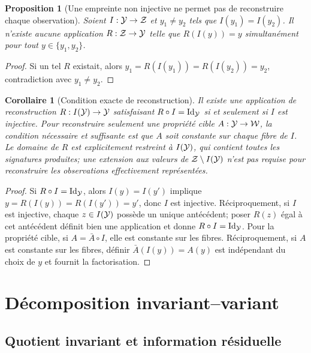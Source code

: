 \documentclass[11pt,oneside]{book}
\newtheorem{proposition}[theoreme]{Proposition}
\newtheorem{corollaire}[theoreme]{Corollaire}
\theoremstyle{definition}\newtheorem{definition}[theoreme]{Définition}\newtheorem{hypothese}[theoreme]{Hypothèse explicite}\newtheorem{convention}[theoreme]{Convention}\newtheorem{critere}[theoreme]{Critère}
\theoremstyle{remark}\newtheorem{remarque}[theoreme]{Remarque}\newtheorem{contreexemple}[theoreme]{Contre-exemple}
\begin{document}
\begin{proposition}[Une empreinte non injective ne permet pas de reconstruire chaque observation]
Soient \(I:\mathcal Y\to\mathcal Z\) et \(y_1\ne y_2\) tels que \(I(y_1)=I(y_2)\). Il n'existe aucune application \(R:\mathcal Z\to\mathcal Y\) telle que \(R(I(y))=y\) simultanément pour tout \(y\in\{y_1,y_2\}\).
\end{proposition}
\begin{proof}
Si un tel \(R\) existait, alors \(y_1=R(I(y_1))=R(I(y_2))=y_2\), contradiction avec \(y_1\ne y_2\).\end{proof}
\begin{corollaire}[Condition exacte de reconstruction]
Il existe une application de reconstruction $R:I(\mathcal Y)\to\mathcal Y$ satisfaisant $R\circ I=\operatorname{Id}_\mathcal Y$ si et seulement si $I$ est injective. Pour reconstruire seulement une propriété cible $A:\mathcal Y\to\mathcal W$, la condition nécessaire et suffisante est que $A$ soit constante sur chaque fibre de $I$. Le domaine de $R$ est explicitement restreint à $I(\mathcal Y)$, qui contient toutes les signatures produites; une extension aux valeurs de $\mathcal Z\setminus I(\mathcal Y)$ n'est pas requise pour reconstruire les observations effectivement représentées.
\end{corollaire}
\begin{proof}
Si $R\circ I=\operatorname{Id}_\mathcal Y$, alors $I(y)=I(y')$ implique $y=R(I(y))=R(I(y'))=y'$, donc $I$ est injective. Réciproquement, si $I$ est injective, chaque $z\in I(\mathcal Y)$ possède un unique antécédent; poser $R(z)$ égal à cet antécédent définit bien une application et donne $R\circ I=\operatorname{Id}_\mathcal Y$. Pour la propriété cible, si $A=\bar A\circ I$, elle est constante sur les fibres. Réciproquement, si $A$ est constante sur les fibres, définir $\bar A(I(y))=A(y)$ est indépendant du choix de $y$ et fournit la factorisation.\end{proof}

\part{Décomposition invariant--variant}
\chapter{Quotient invariant et information résiduelle}
\end{document}

